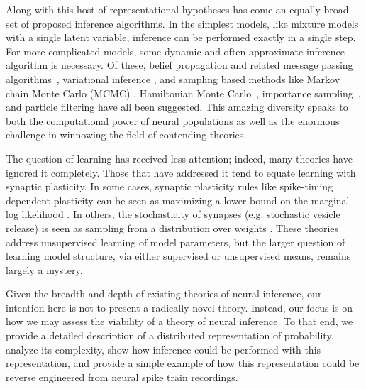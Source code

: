 Along with this host of representational hypotheses has come an
equally broad set of proposed inference algorithms. 
In
the simplest models, like mixture models with a single latent
variable, inference can be performed exactly in a single step.  For
more complicated models, some dynamic and often approximate inference 
algorithm is necessary. Of these, belief propagation and related
message passing algorithms~\citep{Rao2007, litvak2009cortical},
variational inference \citep{Friston2010, nessler2013bayesian},
and sampling based methods like Markov chain Monte Carlo (MCMC)
\citep{hoyer2003interpreting, Buesing2011, 
  Berkes2011, gershman2012multistability, legenstein2014ensembles},
Hamiltonian Monte Carlo~\citep{aitchison2014hamiltonian},
importance sampling~\citep{Shi2009}, 
and particle filtering \citep{lee2003hierarchical} have
all been suggested. This amazing diversity speaks to both the
computational power of neural populations as well as the
enormous challenge in winnowing the field of contending theories.

The question of learning has received less attention; indeed, many
theories have ignored it completely. Those that have addressed it tend to
equate learning with synaptic plasticity. In some cases, synaptic
plasticity rules like spike-timing dependent plasticity can be seen as
maximizing a lower bound on the marginal log likelihood
\citep{Friston2010, nessler2013bayesian, rezende2011variational}. In
others, the stochasticity of synapses (e.g. stochastic vesicle
release) is seen as sampling from a distribution over weights
\citep{aitchison2015synaptic, kappel2015synaptic, kappel2015network, tully2014synaptic}.
These theories address unsupervised learning of model parameters, but
the larger question of learning model structure, via either supervised
or unsupervised means, remains largely a mystery.


Given the breadth and depth of existing theories of neural inference,
our intention here is not to present a radically novel
theory. Instead, our focus is on how we may assess the viability of a
theory of neural inference. To that end, we provide a detailed
description of a distributed representation of probability, analyze
its complexity, show how inference could be performed with this representation,
and provide a simple example of how this representation could be
reverse engineered from neural spike train recordings. 

